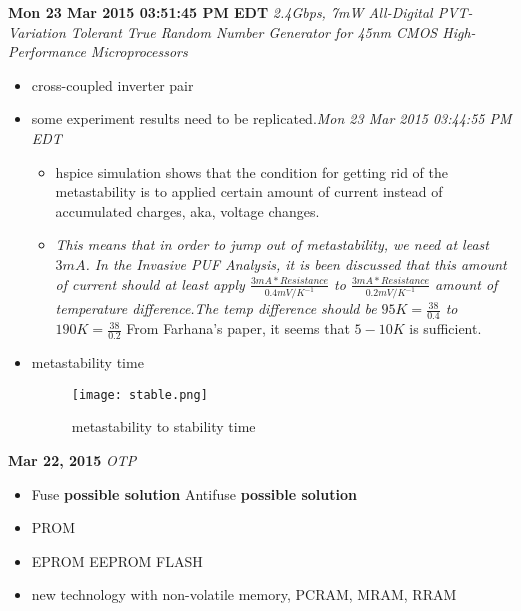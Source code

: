 \documentclass[]{article}
\newcommand{\solved}[1]{{\color{blue}\textit{#1}}}
\begin{document}
\noindent \textbf{Mon 23 Mar 2015 03:51:45 PM EDT}
\textit{2.4Gbps, 7mW All-Digital PVT-Variation Tolerant True Random Number
Generator for 45nm CMOS High-Performance Microprocessors}
\indent     \begin{itemize}
            \item cross-coupled inverter pair
            \item some experiment results need to be replicated.\solved{Mon 23
            Mar 2015 03:44:55 PM EDT}
                \begin{itemize}
                    \item hspice simulation shows that the condition for getting
                    rid of the metastability is to applied certain amount of
                    current instead of accumulated charges, aka, voltage
                    changes.
                    \item \solved{This means that in order to jump out of
                    metastability, we need at least $3mA$. In the Invasive PUF
                    Analysis, it is been discussed that this amount of current
                    should at least apply 
                    $\frac{3mA * Resistance}{0.4mV/K^{-1}}$ to
                    $\frac{3mA * Resistance}{0.2mV/K^{-1}}$ 
                    amount of temperature difference.The temp difference should
                    be $95K=\frac{38}{0.4}$ to $190K=\frac{38}{0.2}$}
                    From Farhana's paper, it seems that $5-10K$ is sufficient. 
                \end{itemize}
            \item metastability time
            \begin{figure}
                \begin{center}
                    \texttt{[image: stable.png]}
                    \caption{metastability to stability time}
                \end{center}
            \end{figure}

            \end{itemize}

\noindent \textbf{Mar 22, 2015}
\textit{OTP}
\indent     \begin{itemize}
            \item Fuse \textbf{possible solution} Antifuse \textbf{possible
            solution}
            \item PROM
            \item EPROM EEPROM FLASH
            \item new technology with non-volatile memory, PCRAM, MRAM, RRAM 
            \end{itemize}
\end{document}
